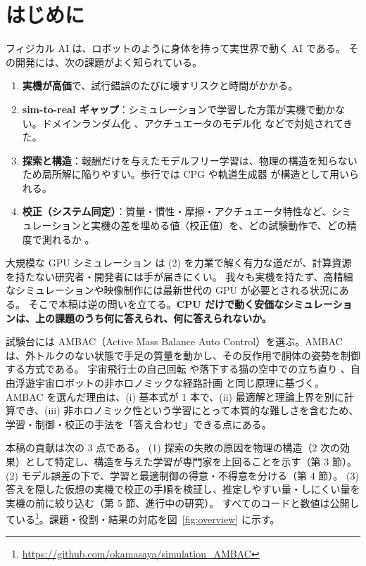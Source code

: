 \documentclass[paper=a4paper,fontsize=10pt,twocolumn,column_gap=2zw,line_length=24zw,number_of_lines=46,head_space=20mm]{jlreq}
\newcommand{\repo}{https://github.com/okamasaya/simulation_AMBAC}
\begin{document}
\section{はじめに}

フィジカル AI は、ロボットのように身体を持って実世界で動く AI である。
その開発には、次の課題がよく知られている。
\begin{enumerate}\setlength{\itemsep}{0pt}
\item \textbf{実機が高価}で、試行錯誤のたびに壊すリスクと時間がかかる。
\item \textbf{sim-to-real ギャップ}：シミュレーションで学習した方策が実機で動かない。ドメインランダム化 \cite{tobin2017,peng2018}、アクチュエータのモデル化 \cite{hwangbo2019} などで対処されてきた。
\item \textbf{探索と構造}：報酬だけを与えたモデルフリー学習は、物理の構造を知らないため局所解に陥りやすい。歩行では CPG \cite{ijspeert2008} や軌道生成器 \cite{iscen2018} が構造として用いられる。
\item \textbf{校正（システム同定）}：質量・慣性・摩擦・アクチュエータ特性など、シミュレーションと実機の差を埋める値（校正値）を、どの試験動作で、どの精度で測れるか \cite{atkeson1986,gautier1990}。
\end{enumerate}

大規模な GPU シミュレーション \cite{makoviychuk2021} は (2) を力業で解く有力な道だが、計算資源を持たない研究者・開発者には手が届きにくい。
我々も実機を持たず、高精細なシミュレーションや映像制作には最新世代の GPU が必要とされる状況にある。
そこで本稿は逆の問いを立てる。\textbf{CPU だけで動く安価なシミュレーションは、上の課題のうち何に答えられ、何に答えられないか。}

試験台には AMBAC（Active Mass Balance Auto Control）を選ぶ。AMBAC は、外トルクのない状態で手足の質量を動かし、その反作用で胴体の姿勢を制御する方式である。
宇宙飛行士の自己回転 \cite{kane1970} や落下する猫の空中での立ち直り \cite{kane1969,montgomery1993}、自由浮遊宇宙ロボットの非ホロノミックな経路計画 \cite{nakamura1991} と同じ原理に基づく。
AMBAC を選んだ理由は、(i) 基本式が 1 本で、(ii) 最適解と理論上界を別に計算でき、(iii) 非ホロノミック性という学習にとって本質的な難しさを含むため、
学習・制御・校正の手法を「答え合わせ」できる点にある。

本稿の貢献は次の 3 点である。
(1) 探索の失敗の原因を物理の構造（2 次の効果）として特定し、構造を与えた学習が専門家を上回ることを示す（第 3 節）。
(2) モデル誤差の下で、学習と最適制御の得意・不得意を分ける（第 4 節）。
(3) 答えを隠した仮想の実機で校正の手順を検証し、推定しやすい量・しにくい量を実機の前に絞り込む（第 5 節、進行中の研究）。
すべてのコードと数値は公開している\footnote{\url{\repo}}。課題・役割・結果の対応を図~\ref{fig:overview} に示す。
\end{document}
